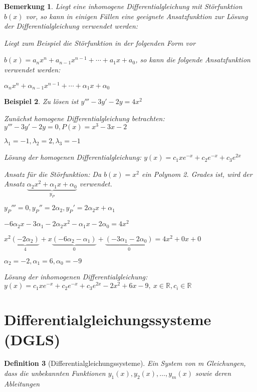 \documentclass[fontset=ubuntu,11pt,a4paper,fleqn,headsepline]{scrreprt}
\newtheorem{defi}{Definition}[section]
\newtheorem{bemerkung}[defi]{Bemerkung}
\newtheorem{beispiel}[defi]{Beispiel}
\begin{document}
\begin{multicols}{2}
         \begin{bemerkung}
             Liegt eine inhomogene Differentialgleichung mit Störfunktion \(b(x)\) vor, so kann in einigen Fällen eine geeignete Ansatzfunktion zur Lösung der Differentialgleichung verwendet werden:
    
             Liegt zum Beispiel die Störfunktion in der folgenden Form vor
    
             \(b(x)=a_n x^n + a_{n-1} x^{n-1} + \cdots + a_1 x + a_0\), so kann die folgende Ansatzfunktion verwendet werden:
    
             \(\alpha_n x^n + \alpha_{n-1} x^{n-1} + \cdots + \alpha_1 x + \alpha_0\)
         \end{bemerkung}
    
         \begin{beispiel}
            Zu lösen ist \(y'''-3y'-2y=4x^2\)
    
            Zunächst homogene Differentialgleichung betrachten: \(y'''-3y'-2y=0,P(x)=x^3-3x-2\)
    
            \(\lambda_1=-1,\lambda_2=2,\lambda_3=-1\)
    
            Lösung der homogenen Differentialgleichung: \(y(x)=c_1xe^{-x}+c_2e^{-x}+c_3e^{2x}\)
    
            Ansatz für die Störfunktion: Da \(b(x)=x^2\) ein Polynom 2. Grades ist, wird der Ansatz \(\underbrace{\alpha_2x^2+\alpha_1x+\alpha_0}_{y_P}\) verwendet.
    
            \({y_P}'''=0,{y_P}''=2\alpha_2,{y_P}'=2\alpha_2x+\alpha_1\)
    
            \(-6\alpha_2x-3\alpha_1-2\alpha_2x^2-\alpha_1x-2\alpha_0=4x^2\)
    
            \(x^2\underbrace{(-2\alpha_2)}_4+x\underbrace{(-6\alpha_2-\alpha_1)}_0+\underbrace{(-3\alpha_1-2\alpha_0)}_0=4x^2+0x+0\)
    
            \(\alpha_2=-2,\alpha_1=6,\alpha_0=-9\)
    
            Lösung der inhomogenen Differentialgleichung: \(y(x)=c_1xe^{-x}+c_2e^{-x}+c_3e^{2x}-2x^2+6x-9,\ x\in\mathbb{R},c_i\in\mathbb{R}\)
         \end{beispiel}
    
         \section*{Differentialgleichungssysteme (DGLS)}
    
         \begin{defi}[Differential\-gleichungs\-systeme]
            Ein System von m Gleichungen, dass die unbekannten Funktionen \(y_1(x),y_2(x),\dots,y_m(x)\) sowie deren Ableitungen
    

\end{defi}
\end{multicols}
\end{document}
